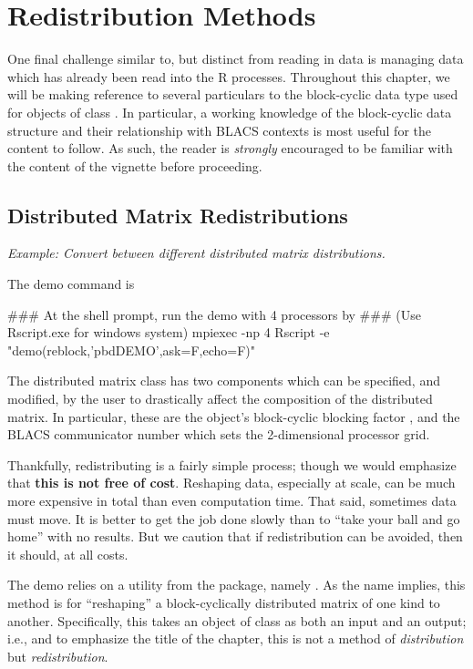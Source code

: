 \chapter{Redistribution Methods}
\label{sec:redist}

One final challenge similar to, but distinct from reading in data is managing data which has already been read into the R processes.  Throughout this chapter, we will be making reference to several particulars to the block-cyclic data type used for objects of class .  In particular, a working knowledge of the block-cyclic data structure and their relationship with BLACS contexts is most useful for the content to follow.  As such, the reader is \emph{strongly} encouraged to be familiar with the content of the  vignette before proceeding.

\section{Distributed Matrix Redistributions}
\label{sec:dmatredist}

\emph{Example:  Convert between different distributed matrix distributions.}

The demo command is
\begin{Command}
### At the shell prompt, run the demo with 4 processors by
### (Use Rscript.exe for windows system)
mpiexec -np 4 Rscript -e "demo(reblock,'pbdDEMO',ask=F,echo=F)"
\end{Command}

The distributed matrix class  has two components which can be specified, and modified, by the user to drastically affect the composition of the distributed matrix.  In particular, these are the object's block-cyclic blocking factor , and the BLACS communicator number  which sets the 2-dimensional processor grid.  

Thankfully, redistributing is a fairly simple process; though we would emphasize that \textbf{this is not free of cost}.  Reshaping data, especially at scale, can be much more expensive in total than even computation time.  That said, sometimes data must move.  It is better to get the job done slowly than to ``take your ball and go home'' with no results.  But we caution that if redistribution can be avoided, then it should, at all costs.

The demo relies on a utility from the  package, namely .  As the name implies, this method is for ``reshaping'' a block-cyclically distributed matrix of one kind to another.  Specifically, this takes an object of class  as both an input and an output; i.e., and to emphasize the title of the chapter, this is not a method of \emph{distribution} but \emph{redistribution}.

